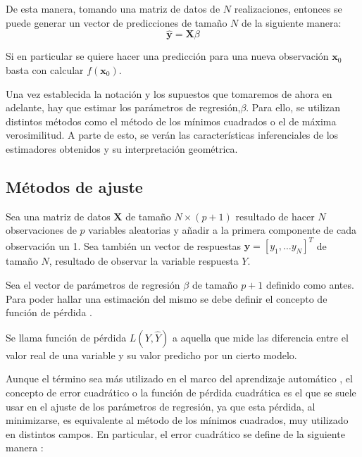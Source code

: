 \noindent De esta manera, tomando una matriz de datos de $N$ realizaciones, entonces se puede generar un vector de predicciones de tamaño $N$ de la siguiente manera:
\begin{equation}
\mathbf{\hat{y}}=\mathbf{X}\beta 
\end{equation}  

\noindent Si en particular se quiere hacer una predicción para una nueva observación  $\mathbf{x}_0$ basta con calcular  $f(\textbf{x}_0).$

\noindent Una vez establecida la notación y los supuestos que tomaremos de ahora en adelante, hay que estimar los parámetros de regresión,$\beta$.  Para ello, se utilizan  distintos métodos como el método de los mínimos cuadrados o el de máxima verosimilitud. A parte de esto, se verán las características inferenciales de los estimadores obtenidos y su interpretación geométrica. 

\subsection{Métodos de ajuste}

\noindent Sea una matriz de datos $\textbf{X}$ de tamaño $N\times (p+1)$ resultado de hacer $N$ observaciones de $p$ variables aleatorias y añadir a la primera componente de cada observación un 1. Sea también un vector de respuestas $\textbf{y}=[y_1,\ldots y_N]^T$ de tamaño $N$, resultado de observar la variable respuesta $Y$. 

\noindent Sea el vector de parámetros de regresión $\beta$ de tamaño $p+1$ definido como antes. Para poder hallar una estimación del mismo se debe definir el concepto de función de pérdida \cite{Hastie 2001}. 

\begin{defi}
Se llama función de pérdida $L(Y, \hat{Y})$ a aquella que mide las diferencia  entre el valor real de una variable y su valor predicho por un cierto modelo.  
\end{defi}

\noindent Aunque el término sea más utilizado en el marco del aprendizaje automático \cite{James 2013}, el concepto de error cuadrático o la función de pérdida cuadrática es el que se suele usar en el ajuste de los parámetros de regresión, ya que esta pérdida, al minimizarse, es equivalente al método de los mínimos cuadrados, muy utilizado en distintos campos. En particular, el error cuadrático se define de la siguiente manera \cite{Abdi 2007}:

